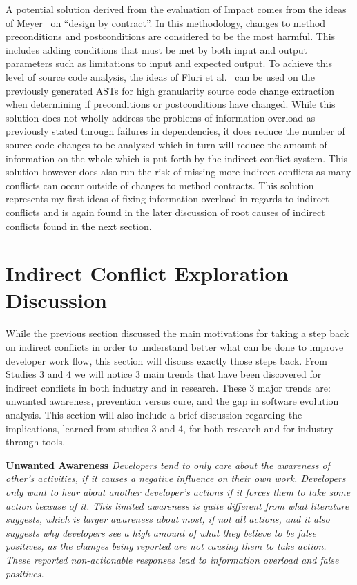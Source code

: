 A potential solution derived from the evaluation of Impact comes from the ideas of Meyer~\cite{Meyer:1988} on 
``design by contract''. In this methodology, changes to method preconditions and postconditions are considered 
to be the most harmful. This includes adding conditions that must be met by both input and output parameters 
such as limitations to input and expected output. To achieve this level of source code analysis, the ideas of 
Fluri et al.~\cite{Fluri:2007:CDT} can be used on the previously generated ASTs for high granularity source code 
change extraction when determining if preconditions or postconditions have changed. While this solution does not 
wholly address the problems of information overload as previously stated through failures in dependencies, it does 
reduce the number of source code changes to  be analyzed which in turn will reduce the amount of information on 
the whole which is put forth by the indirect
conflict system. This solution however does also run the risk of missing more indirect conflicts as many conflicts
can occur outside of changes to method contracts. This solution represents my first ideas of fixing information overload in regards to
indirect conflicts and is again found in the later discussion of root causes of indirect conflicts found in
the next section.

\section{Indirect Conflict Exploration Discussion}

While the previous section discussed the main motivations for taking a step back on indirect conflicts in order to understand
better what can be done to improve developer work flow, this section will discuss exactly those steps back. From Studies 3 and
4 we will notice 3 main trends that have been discovered for indirect conflicts in both industry and in research. These 3 major
trends are: unwanted awareness, prevention versus cure, and the gap in software evolution analysis. This
section will also include a brief discussion regarding the implications, learned from studies 3 and 4, for both research and
for industry through tools.

\textbf{Unwanted Awareness} \textit{Developers tend to only care about the awareness of other's activities, if it causes
a negative influence on their own work. Developers only want to hear about another developer's actions if it forces them
to take some action because of it. This limited awareness is quite different from what literature suggests, which is larger
awareness about most, if not all actions, and it also suggests why developers see a high amount of what they believe to be
false positives, as the changes being reported are not causing them to take action. These reported non-actionable responses
lead to information overload and false positives.}

